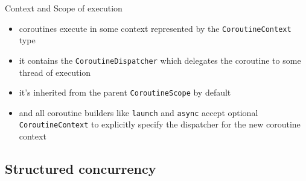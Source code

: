 \documentclass[hyperref={pdfpagelabels=false},xcolor={dvipsnames},compress,onlytextwidth]{beamer}
\begin{document}
    \begin{frame}[fragile]{Context and Scope of execution}
        \only<1-5>{}
        \begin{itemize}
            \item<2-> coroutines execute in some context represented by the \texttt{CoroutineContext} type
            \item<3-> it contains the \texttt{CoroutineDispatcher} which delegates the coroutine to some thread of execution
            \item<4-> it's inherited from the parent \texttt{CoroutineScope} by default
            \item<5-> and all coroutine builders like \texttt{launch} and \texttt{async} accept optional \texttt{CoroutineContext} to explicitly specify the dispatcher for the new coroutine context
        \end{itemize}
    \end{frame}

    \subsection{Structured concurrency}
\end{document}
